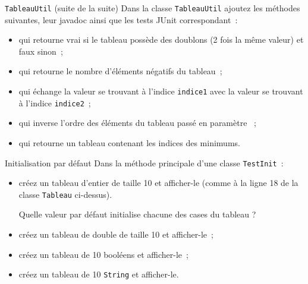 \documentclass[a4paper,11pt]{style-esi/td}
\begin{document}
	\begin{Exercice}{\texttt{TableauUtil} (suite de la suite)}	
		Dans la classe \texttt{TableauUtil} ajoutez les méthodes suivantes, leur
		 javadoc ainsi que les tests JUnit correspondant~:
		\begin{itemize}
			\item {} 
				qui retourne vrai si le tableau possède des doublons 
				(2 fois la même valeur) et faux sinon~;
			\item {} 
				qui retourne le nombre d'éléments négatifs du tableau~;
			\item {} 
				qui échange la valeur se trouvant à l'indice \texttt{indice1} 
				avec la valeur se trouvant à l'indice \texttt{indice2}~;
			\item {} 
				qui inverse l'ordre des éléments  du tableau passé en paramètre ~;				
			\item {} 
				qui retourne un tableau contenant les indices des minimums.
		\end{itemize}
	\end{Exercice}
	
		
	\begin{Exercice}{Initialisation par défaut}	
		Dans la méthode principale d'une classe \texttt{TestInit}~:
		\begin{itemize}
			\item créez un tableau d'entier de taille 10 et afficher-le 
				(comme à  la ligne 18 de la classe \texttt{Tableau} ci-dessus). 
				
				Quelle valeur par défaut initialise chacune des cases du tableau ?
			\item créez un tableau de double de taille 10 et afficher-le~;
			\item créez un tableau de 10 booléens et afficher-le~;
			\item créez un tableau de 10 \texttt{String} et afficher-le.
		\end{itemize}
	\end{Exercice}
\end{document}
